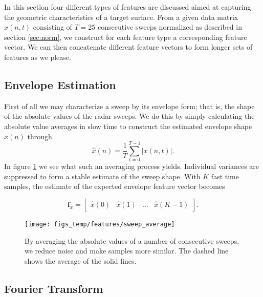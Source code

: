 In this section four different types of features are discussed aimed at capturing the geometric characteristics of a target surface. From a given data matrix $x(n,t)$ consisting of $T=25$ consecutive sweeps normalized as described in section \ref{sec:norm}, we construct for each feature type a corresponding feature vector. We can then concatenate different feature vectors to form longer sets of features as we please.  

\subsection{Envelope Estimation}

First of all we may characterize a sweep by its envelope form; that is, the shape of the absolute values of the radar sweeps. We do this by simply calculating the absolute value averages in slow time to construct the estimated envelope shape $\hat{x}(n)$ through
\begin{equation}
	\hat{x}(n) = \frac{1}{T}\sum_{t=0}^{T-1}|x(n, t)|.
\end{equation}
In figure \ref{fig:sweep_average} we see what such an averaging process yields. Individual variances are suppressed to form a stable estimate of the sweep shape. With $K$ fast time samples, the estimate of the expected envelope feature vector becomes 

\begin{equation}
	\mathbf{f}_{x} = 
	\begin{bmatrix}
		\hat{x}(0) & \hat{x}(1) & ... & \hat{x}(K-1)
	\end{bmatrix}.
\end{equation}


\begin{figure}[h]
	\centering
	\texttt{[image: figs\_temp/features/sweep\_average]}
	\caption{By averaging the absolute values of a number of consecutive sweeps, we reduce noise and make samples more similar. The dashed line shows the average of the solid lines. }
	\label{fig:sweep_average}
\end{figure}


\subsection{Fourier Transform}

